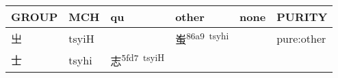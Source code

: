 \documentclass[14pt,a4paper]{scrartcl}
\begin{document}
\begin{longtable}[c]{@{}llllll@{}}
\toprule
\begin{minipage}[b]{0.14\columnwidth}\raggedright\strut
GROUP
\strut\end{minipage} &
\begin{minipage}[b]{0.14\columnwidth}\raggedright\strut
MCH
\strut\end{minipage} &
\begin{minipage}[b]{0.14\columnwidth}\raggedright\strut
qu
\strut\end{minipage} &
\begin{minipage}[b]{0.14\columnwidth}\raggedright\strut
other
\strut\end{minipage} &
\begin{minipage}[b]{0.14\columnwidth}\raggedright\strut
none
\strut\end{minipage} &
\begin{minipage}[b]{0.14\columnwidth}\raggedright\strut
PURITY
\strut\end{minipage}\tabularnewline
\midrule
\endhead
\begin{minipage}[t]{0.14\columnwidth}\raggedright\strut
㞢
\strut\end{minipage} &
\begin{minipage}[t]{0.14\columnwidth}\raggedright\strut
tsyiH
\strut\end{minipage} &
\begin{minipage}[t]{0.14\columnwidth}\raggedright\strut
\strut\end{minipage} &
\begin{minipage}[t]{0.14\columnwidth}\raggedright\strut
蚩\textsuperscript{86a9~tsyhi}
\strut\end{minipage} &
\begin{minipage}[t]{0.14\columnwidth}\raggedright\strut
\strut\end{minipage} &
\begin{minipage}[t]{0.14\columnwidth}\raggedright\strut
pure:other
\strut\end{minipage}\tabularnewline
\begin{minipage}[t]{0.14\columnwidth}\raggedright\strut
士
\strut\end{minipage} &
\begin{minipage}[t]{0.14\columnwidth}\raggedright\strut
tsyhi
\strut\end{minipage} &
\begin{minipage}[t]{0.14\columnwidth}\raggedright\strut
志\textsuperscript{5fd7~tsyiH}
\strut\end{minipage} &

\end{longtable}
\end{document}
